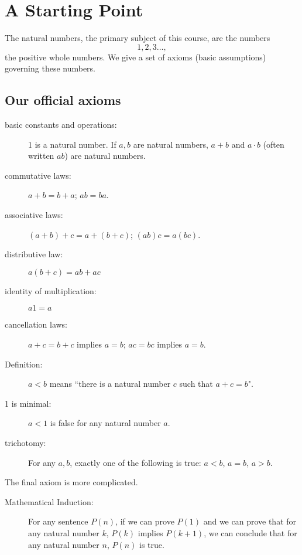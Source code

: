 \documentclass[12pt]{article}
\begin{document}
\tableofcontents

\newpage

\section{A Starting Point}

The natural numbers, the primary subject of this course, are the numbers $$1,2,3\ldots, $$  the positive whole numbers.
We give a set of axioms (basic assumptions) governing these numbers.

\subsection{Our official axioms}

\begin{description}

\item[basic constants and operations:]  1 is a natural number.  If $a,b$ are natural numbers, $a+b$ and $a\cdot b$ (often written $ab$) are natural numbers.

\item[commutative laws:]  $a+b=b+a$; $ab=ba$. 

\item[associative laws:]  $(a+b)+c=a+(b+c)$;  $(ab)c=a(bc)$.

\item[distributive law:]  $a(b+c)=ab+ac$

\item[identity of multiplication:]  $a1=a$

\item[cancellation laws:]  $a+c=b+c$ implies $a=b$;  $ac=bc$ implies $a=b$.

\item[Definition:]  $a<b$ means ``there is a natural number $c$ such that $a+c=b$".

\item[1 is minimal:]  $a<1$ is false for any natural number $a$.

\item[trichotomy:]  For any $a,b$, exactly one of the following is true:  $a<b$, $a=b$, $a>b$.

\end{description}

The final axiom is more complicated.

\begin{description}

\item[Mathematical Induction:]  For any sentence $P(n)$, if we can prove $P(1)$ and we can prove that for
any natural number $k$, $P(k)$ implies $P(k+1)$, we can conclude that for any natural number $n$, $P(n)$ is true.

\end{description}
\end{document}
